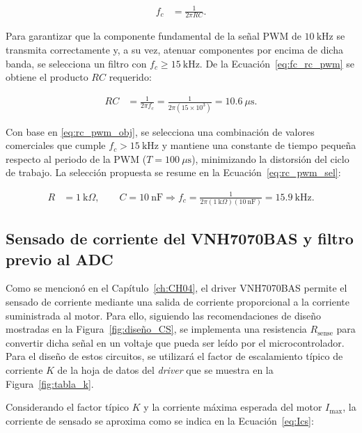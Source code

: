 \begin{align}
f_c&=\frac{1}{2\pi RC}.
\label{eq:fc_rc_pwm}
\end{align}

Para garantizar que la componente fundamental de la señal \ac{PWM} de \(10~\mathrm{kHz}\) se transmita correctamente y, a su vez, atenuar componentes por encima de dicha banda, se selecciona un filtro con \(f_c \geq 15~\mathrm{kHz}\). De la Ecuación~\ref{eq:fc_rc_pwm} se obtiene el producto \(RC\) requerido:

\begin{align}
RC&=\frac{1}{2\pi f_c}
= \frac{1}{2\pi(15\times 10^3)}
= 10.6~\mu\mathrm{s}.
\label{eq:rc_pwm_obj}
\end{align}

Con base en \ref{eq:rc_pwm_obj}, se selecciona una combinación de valores comerciales que cumple \(f_c>15~\mathrm{kHz}\) y mantiene una constante de tiempo pequeña respecto al periodo de la \ac{PWM} (\(T=100~\mu\mathrm{s}\)), minimizando la distorsión del ciclo de trabajo. La selección propuesta se resume en la Ecuación~\ref{eq:rc_pwm_sel}:

\begin{align}
R&=1~\mathrm{k}\Omega, \qquad C=10~\mathrm{nF}
\Rightarrow
f_c=\frac{1}{2\pi(1~\mathrm{k}\Omega)(10~\mathrm{nF})}= 15.9~\mathrm{kHz}.
\label{eq:rc_pwm_sel}
\end{align}

\subsection{Sensado de corriente del VNH7070BAS y filtro previo al ADC}
\label{subsec:cs_vnh7070}

Como se mencionó en el Capítulo~\ref{ch:CH04}, el driver VNH7070BAS permite el sensado de corriente mediante una salida de corriente proporcional a la corriente suministrada al motor. Para ello, siguiendo las recomendaciones de diseño mostradas en la Figura~\ref{fig:diseño_CS}, se implementa una resistencia \(R_{\mathrm{sense}}\) para convertir dicha señal en un voltaje que pueda ser leído por el microcontrolador. Para el diseño de estos circuitos, se utilizará el factor de escalamiento típico de corriente \(K\) de la hoja de datos del \textit{driver} que se muestra en la Figura~\ref{fig:tabla_k}.

Considerando el factor típico \(K\) y la corriente máxima esperada del motor \(I_{\max}\), la corriente de sensado se aproxima como se indica en la Ecuación~\ref{eq:Ics}:

